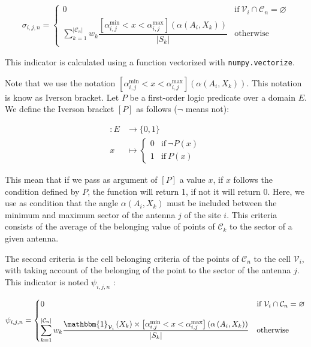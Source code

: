 \documentclass[a4paper, 11pt]{report}
\begin{document}
    \begin{align}
        \sigma_{i, j, n} = \begin{cases}
            0 & \text{if} \ \mathcal{V}_i \cap \mathcal{C}_n = \varnothing \\[10pt]
            \displaystyle \sum_{k=1}^{\left|\mathcal{C}_n\right|}{w_k\dfrac{\left[\alpha^\text{min}_{i, j} < x < \alpha^\text{max}_{i, j}\right]\left(\alpha\left(A_i,X_k\right)\right)}{\left|S_k\right|}} & \text{otherwise}
        \end{cases}
    \end{align}
    
    This indicator is calculated using a function vectorized with \texttt{numpy.vectorize}.
    
    Note that we use the notation $\left[\alpha^\text{min}_{i, j} < x < \alpha^\text{max}_{i, j}\right]\left(\alpha\left(A_i,X_k\right)\right)$. This notation is know as Iverson bracket. Let $P$ be a first-order logic predicate over a domain $E$. We define the Iverson bracket $[P]$ as follows ($\neg$ means not):
    
    \begin{align}
        [P]: E & \longrightarrow  \{0, 1\} \\[5pt]
        x & \longmapsto  \begin{cases}
            0 & \text{if} \ \neg P(x) \\
            1 & \text{if} \ P(x)
        \end{cases}
    \end{align}
    
    This mean that if we pass as argument of $[P]$ a value $x$, if $x$ follows the condition defined by $P$, the function will return 1, if not it will return 0. Here, we use as condition that the angle $\alpha\left(A_i,X_k\right)$ must be included between the minimum and maximum sector of the antenna $j$ of the site $i$. This criteria consists of the average of the belonging value of points of $\mathcal{C}_k$ to the sector of a given antenna.
    \newpage
    
    The second criteria is the cell belonging criteria of the points of $\mathcal{C}_n$ to the cell $\mathcal{V}_i$, with taking account of the belonging of the point to the sector of the antenna $j$. This indicator is noted $\psi_{i, j, n}$ \cite{trieu_visualization_2019}: 
    
    \begin{align}
        \psi_{i, j, n} = \begin{cases}
            0 & \text{if} \ \mathcal{V}_i \cap \mathcal{C}_n = \varnothing \\[10pt]
            \displaystyle \sum_{k=1}^{\left|\mathcal{C}_n\right|}{w_k\dfrac{\mathbbm{1}_{\mathcal{V}_i}\left(X_k\right) \times \left[\alpha^\text{min}_{i, j} < x < \alpha^\text{max}_{i, j}\right]\left(\alpha\left(A_i,X_k\right)\right)}{\left|S_k\right|}} & \text{otherwise}
        \end{cases}
    \end{align}
    
\end{document}
